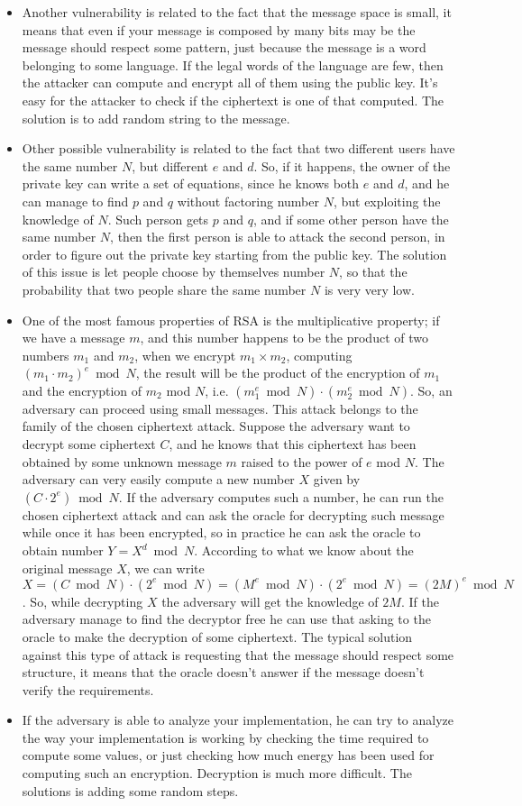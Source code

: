 \documentclass[11pt]{article}
\begin{document}
\begin{itemize}
\item Another vulnerability is related to the fact that the message space is small, it means that even if your message is composed by many bits may be the message should respect some pattern, just because the message is a word belonging to some language. If the legal words of the language are few, then the attacker can compute and encrypt all of them using the public key. It’s easy for the attacker to check if the ciphertext is one of that computed. The solution is to add random string to the message.
\item Other possible vulnerability is related to the fact that two different users have the same number $N$, but different $e$ and $d$. So, if it happens, the owner of the private key can write a set of equations, since he knows both $e$ and $d$, and he can manage to find $p$ and $q$ without factoring number $N$, but exploiting the knowledge of $N$. Such person gets $p$ and $q$, and if some other person have the same number $N$, then the first person is able to attack the second person, in order to figure out the private key starting from the public key. The solution of this issue is let people choose by themselves number $N$, so that the probability that two people share the same number $N$ is very very low.
\item One of the most famous properties of RSA is the multiplicative property; if we have a message $m$, and this number happens to be the product of two numbers $m_1$ and $m_2$, when we encrypt $m_1 \times m_2$, computing $(m_1 \cdot m_2)^e \bmod N$, the result will be the product of the encryption of $m_1$ and the encryption of $m_2 $ mod $N$, i.e. $(m_1^e \bmod N) \cdot (m_2^e \bmod N)$. So, an adversary can proceed using small messages. This attack belongs to the family of the chosen ciphertext attack. Suppose the adversary want to decrypt some ciphertext $C$, and he knows that this ciphertext has been obtained by some unknown message $m$ raised to the power of $e$ mod $N$. The adversary can very easily compute a new number $X$ given by $(C \cdot 2^e) \bmod N$. If the adversary computes such a number, he can run the chosen ciphertext attack and can ask the oracle for decrypting such message while once it has been encrypted, so in practice he can ask the oracle to obtain number $Y =X^d \bmod N$. According to what we know about the original message $X$, we can write $X = (C \bmod N) \cdot (2^e \bmod N) = (M^e \bmod N) \cdot (2^e \bmod N) = (2M)^e \bmod N$. So, while decrypting $X$ the adversary will get the knowledge of $2M$. If the adversary manage to find the decryptor free he can use that asking to the oracle to make the decryption of some ciphertext. The typical solution against this type of attack is requesting that the message should respect some structure, it means that the oracle doesn't answer if the message doesn't verify the requirements.
\item  If the adversary is able to analyze your implementation, he can try to analyze the way your implementation is working by checking the time required to compute some values, or just checking how much energy has been used for computing such an encryption. Decryption is much more difficult. The solutions is adding some random steps.
\end{itemize} 
\end{document}
